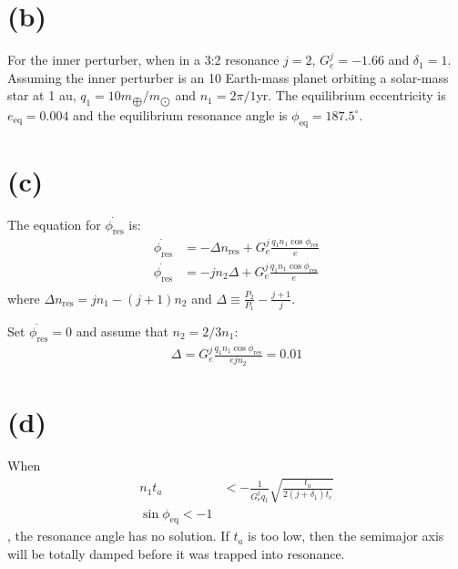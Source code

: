 \documentclass[a4paper,12pt]{article}
\begin{document}
\section*{(b)}
For the inner perturber, when in a 3:2 resonance $j=2$, $G_e^j = -1.66$ and $\delta_1 = 1$.
Assuming the inner perturber is an 10 Earth-mass planet orbiting a solar-mass star at 1 au, 
$q_1 = 10m_{\bigoplus}/m_{\bigodot}$ and $n_1 = 2\pi/1 $yr.
The equilibrium eccentricity is $e_{\text{eq}} = 0.004$ and the equilibrium resonance angle is 
$\phi_{\text{eq}} = 187.5 ^{\circ}$.

\section*{(c)}
The equation for $\dot{\phi_{\text{res}}}$ is:
\begin{align*}
    \dot{\phi_{\text{res}}} &= - \Delta n_{\text{res}} + G_e^j \frac{q_1 n_1 \cos \phi_{\text{res}}}{e} \\
    \dot{\phi_{\text{res}}} &= - jn_2 \Delta + G_e^j \frac{q_1 n_1 \cos \phi_{\text{res}}}{e} \\
\end{align*}
where $\Delta n_{\text{res}} = jn_1 - (j+1) n_2$ and $\Delta \equiv \frac{P_2}{P_1} - \frac{j+1}{j}$.

Set $\dot{\phi_{\text{res}}}=0$ and assume that $n_2 = 2/3 n_1$:
\begin{align*}
    \Delta = G_e^j \frac{q_1 n_1 \cos \phi_{\text{res}}}{ejn_2} = 0.01
\end{align*}

\section*{(d)}
When 
\begin{align*}
    n_1 t_a &< -\frac{1}{G_e^j q_1} \sqrt{\frac{t_a}{2(j+ \delta_1)t_e}} \\
    \sin \phi_{\text{eq}} < -1
\end{align*}
, the resonance angle has no solution.
If $t_a$ is too low, then the semimajor axis will be totally damped before it was trapped into resonance.
\end{document}
